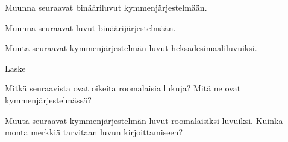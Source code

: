 \begin{tehtavasivu}

\begin{tehtava}
Muunna seuraavat binääriluvut kymmenjärjestelmään.
\begin{vastaus}
\end{vastaus}
\end{tehtava}

\begin{tehtava}
Muunna seuraavat luvut binäärijärjestelmään.
\begin{vastaus}
\end{vastaus}
\end{tehtava}

\begin{tehtava}
Muuta seuraavat kymmenjärjestelmän luvut heksadesimaaliluvuiksi.

\end{tehtava}

\begin{tehtava}
	Laske
	\begin{vastaus}
	\end{vastaus}
\end{tehtava}

\begin{tehtava}
Mitkä seuraavista ovat oikeita roomalaisia lukuja? Mitä ne ovat kymmenjärjestelmässä?
\begin{vastaus}
\end{vastaus}
\end{tehtava}

\begin{tehtava}
Muuta seuraavat kymmenjärjestelmän luvut roomalaisiksi luvuiksi. Kuinka monta merkkiä tarvitaan luvun kirjoittamiseen?
\begin{vastaus}
\end{vastaus}
\end{tehtava}


\end{tehtavasivu}

